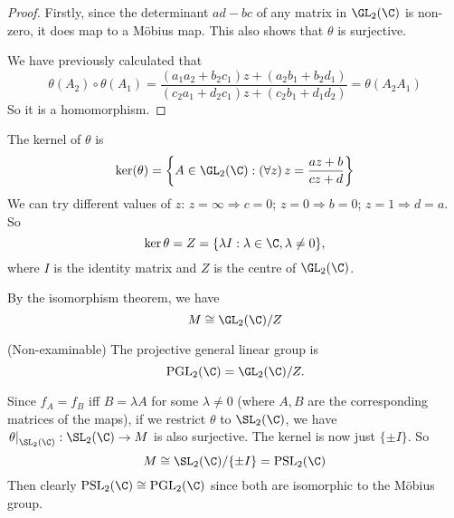 \documentclass[a4paper]{article}
\begin{document}
\begin{proof}
  Firstly, since the determinant $ad - bc$ of any matrix in $\GL_2(\C)$ is non-zero, it does map to a M\"obius map. This also shows that $\theta$ is surjective.

  We have previously calculated that
  \[
    \theta(A_2)\circ \theta(A_1) = \frac{(a_1a_2 + b_2c_1)z + (a_2b_1 + b_2d_1)}{(c_2a_1 + d_2c_1)z + (c_2b_1 + d_1d_2)} = \theta(A_2A_1)
  \]
  So it is a homomorphism.
\end{proof}

The kernel of $\theta$ is
\[
  \ker(\theta) = \left\{A\in \GL_2(\C): (\forall z)\,z = \frac{az + b}{cz + d}\right\}
\]
We can try different values of $z$: $z = \infty \Rightarrow c = 0$; $z = 0 \Rightarrow b = 0$; $z = 1\Rightarrow d = a$. So
\[
  \ker\theta = Z = \{\lambda I: \lambda \in \C, \lambda\not= 0\},
\]
where $I$ is the identity matrix and $Z$ is the centre of $\GL_2(\C)$.

By the isomorphism theorem, we have
\[
  M \cong \GL_2(\C)/Z
\]

\begin{defi}
  (Non-examinable) The projective general linear group is
  \[
    \mathrm{PGL}_2(\C) = \GL_2(\C)/Z.
  \]
\end{defi}
\note Since $f_A = f_B$ iff $B = \lambda A$ for some $\lambda\not= 0$ (where $A, B$ are the corresponding matrices of the maps), if we restrict $\theta$ to $\SL_2(\C)$, we have $\left.\theta\right|_{\SL_2(\C)}: \SL_2(\C)\to M$ is also surjective. The kernel is now just $\{\pm I\}$. So
\[
  M \cong \SL_2(\C)/\{\pm I\} = \mathrm{PSL_2}(\C)
\]
\note Then clearly $\mathrm{PSL}_2(\C)\cong \mathrm{PGL}_2(\C)$ since both are isomorphic to the M\"obius group.
\end{document}
